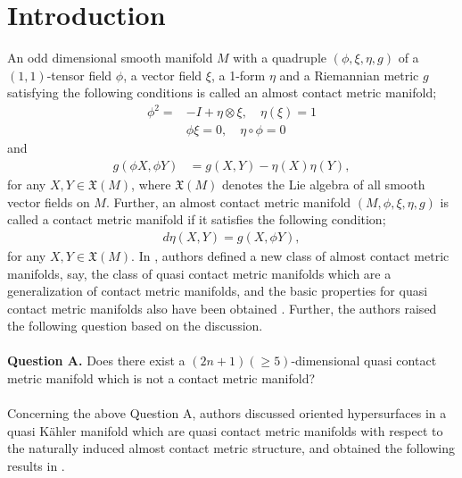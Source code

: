 \documentclass[12pt]{article}
\numberwithin{equation}{section}
\begin{document}
\section{Introduction}\label{sec1}
An odd dimensional smooth manifold $M$ with a quadruple $(\phi, \xi, \eta, g)$ of a $(1,1)$-tensor field $\phi$, a vector field $\xi$, a 1-form $\eta$ and a Riemannian metric $g$ satisfying the following conditions is called an almost contact metric manifold;
\begin{equation}\label{11}
\begin{split}
\phi^2=&-I+\eta\otimes\xi, \quad \eta(\xi)=1\\ &\phi\xi =0,\quad
\eta\circ\phi=0
\end{split}
\end{equation}
and
\begin{equation}\label{12}
\begin{split}
g(\phi{X},\phi{Y})&=g(X,Y)-\eta(X)\eta(Y),
\end{split}
\end{equation}
for any $X, Y \in\mathfrak{X}(M)$, where $\mathfrak{X}(M)$ denotes the
Lie algebra of all smooth vector fields on $M$. Further, an almost contact metric manifold $(M, \phi, \xi, \eta, g)$ is called a contact metric manifold if it satisfies the following condition;
\begin{equation}\label{13}
\begin{split}
d\eta(X,Y)=g(X,\phi{Y}),
\end{split}
\end{equation}
for any $X, Y \in\mathfrak{X}(M)$. In \cite{KPS}, authors defined a
new class of almost contact metric manifolds, say, the class of quasi
contact metric manifolds which are a generalization of contact metric manifolds, and the basic properties for quasi contact metric manifolds also have been obtained \cite{CKPSS, PSS}. Further, the authors raised the following question based on the discussion.\\
\\
{\bf{Question A}.} Does there exist a $(2n+1)(\geq 5)$-dimensional quasi contact metric
manifold which is not a contact metric manifold?\\
\\
Concerning the above Question A, authors discussed oriented hypersurfaces in a quasi {K\"ahler} manifold which are quasi contact metric manifolds
with respect to the naturally induced almost contact metric structure, and obtained the following results in \cite{BPS}.\\
\end{document}
